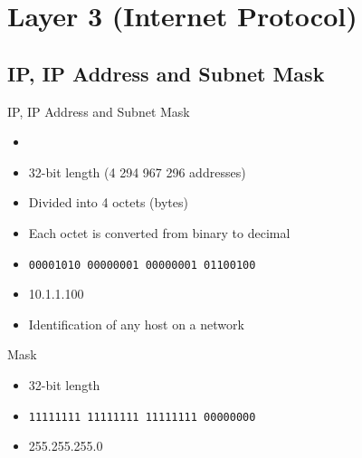 \section[ipv4]{Layer 3 (Internet Protocol)}

\subsection{IP, IP Address and Subnet Mask}
\begin{frame}{IP, IP Address and Subnet Mask}
	 \pause
	\begin{itemize}[<+->]
		\item {}
		\item 32-bit length (4 294 967 296 addresses)
		\item Divided into 4 octets (bytes)
		\item Each octet is converted from binary to decimal
		\item \texttt{00001010 00000001 00000001 01100100}
		\item 10.1.1.100
		\item Identification of any host on a network
	\end{itemize}
	Mask\pause
	\begin{itemize}[<+->]
		\item 32-bit length
		\item \texttt{11111111 11111111 11111111 00000000}
		\item 255.255.255.0
	\end{itemize}
\end{frame}

